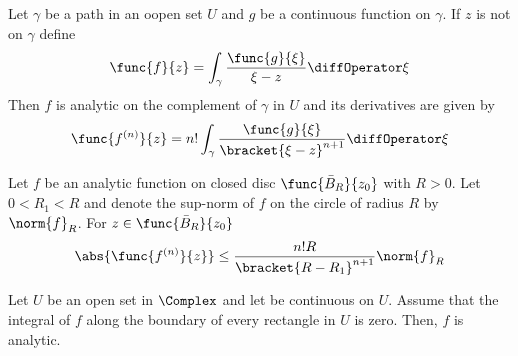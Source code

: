  \begin{theorem}
     Let \(\gamma\) be a path in an oopen set \(U\) and \(g\) be a continuous function on \(\gamma\). If \(z\) is not on \(\gamma\) define 
     \begin{equation*}
         \func{f}{z} = \int_{\gamma} \dfrac{\func{g}{\xi}}{\xi - z} \diffOperator \xi
     \end{equation*}
     Then \(f\) is analytic on the complement of \(\gamma\) in \(U\) and its derivatives are given by 
     \begin{equation*}
         \func{f^{(n)}}{z} = n! \int_{\gamma} \frac{\func{g}{\xi}}{\bracket{\xi - z}^{n+1}} \diffOperator \xi
     \end{equation*}
 \end{theorem}

 \begin{corollary}
     Let \(f\) be an analytic function on closed disc \(\func{\bar{B}_R}{z_0}\) with \(R > 0\). Let \(0 < R_1 < R\) and denote the sup-norm of \(f\) on the circle of radius \(R\) by \(\norm{f}_R\). For \(z \in \func{\bar{B}_R}{z_0}\)
     \begin{equation*}
         \abs{\func{f^{(n)}}{z}} \leq \dfrac{n! R}{\bracket{R - R_1}^{n+1}} \norm{f}_R
     \end{equation*}
 \end{corollary}

 \begin{theorem}
     Let \(U\) be an open set in \(\Complex\) and let be continuous on \(U\). Assume that the integral of \(f\) along the boundary of every rectangle in \(U\) is zero. Then, \(f\) is analytic.
 \end{theorem}